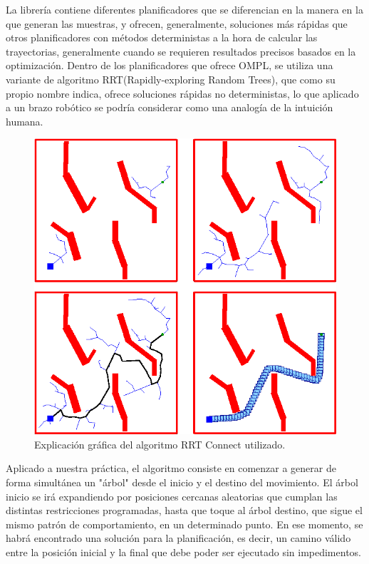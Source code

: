 \documentclass[12pt,spanish,chapterprefix, numbers=noenddot]{book}
\numberwithin{equation}{section}
\numberwithin{figure}{section}
\begin{document}
La librería contiene diferentes planificadores que se diferencian en la manera en la que generan las muestras, y ofrecen, generalmente, soluciones más rápidas que otros planificadores con métodos deterministas  a la hora de calcular las trayectorias, generalmente cuando se requieren resultados precisos basados en la optimización.
Dentro de los planificadores que ofrece OMPL, se utiliza una variante de algoritmo RRT(Rapidly-exploring Random Trees), que como su propio nombre indica, ofrece soluciones rápidas no deterministas, lo que aplicado a un brazo robótico se podría considerar como una analogía de la intuición humana. 

\begin{figure}[hbt!]
\centering
\includegraphics[width=12cm]{Figs/rrtConnect.png}
\par
\caption{\label{fig:rrtConnect}Explicación gráfica del algoritmo RRT Connect utilizado.}
\end{figure}

Aplicado a nuestra práctica, el algoritmo consiste en comenzar a generar de forma simultánea un "árbol" desde el inicio y el destino del movimiento. El árbol inicio se irá expandiendo por posiciones cercanas aleatorias que cumplan las distintas restricciones programadas, hasta que toque al árbol destino, que sigue el mismo patrón de comportamiento, en un determinado punto. En ese momento, se habrá encontrado una solución para la planificación, es decir, un camino válido entre la posición inicial y la final que debe poder ser ejecutado sin impedimentos.
\end{document}
